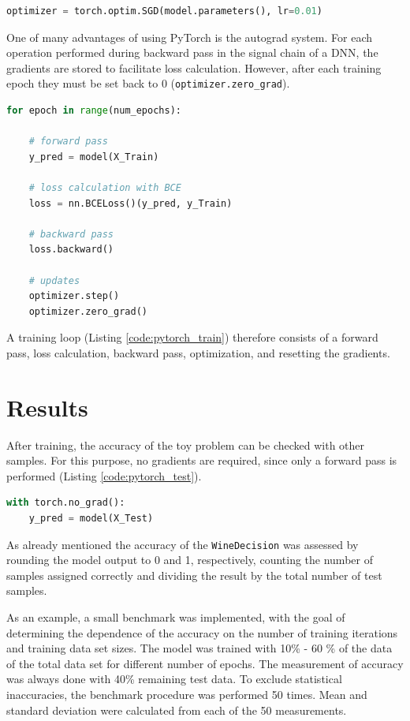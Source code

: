 \begin{lstlisting}[float, language=python, caption={Usage of PyTorchs Stochastic Gradient Descent optimization algorithm.}, label=code:pytorch_optim]
optimizer = torch.optim.SGD(model.parameters(), lr=0.01)
\end{lstlisting}

One of many advantages of using PyTorch is the autograd system. For each operation performed during backward pass in the signal chain of a DNN, the gradients are stored to facilitate loss calculation. However, after each training epoch they must be set back to $0$ (\texttt{optimizer.zero\_grad}).

\begin{lstlisting}[float, language=python, caption={Training loop in PyTorch.}, label=code:pytorch_train]
for epoch in range(num_epochs):

    # forward pass
    y_pred = model(X_Train)
    
    # loss calculation with BCE
    loss = nn.BCELoss()(y_pred, y_Train)

    # backward pass
    loss.backward()

    # updates
    optimizer.step()
    optimizer.zero_grad()
\end{lstlisting}

A training loop (Listing \ref{code:pytorch_train}) therefore consists of a forward pass, loss calculation, backward pass, optimization, and resetting the gradients.

\section{Results}
After training, the accuracy of the toy problem can be checked with other samples. For this purpose, no gradients are required, since only a forward pass is performed (Listing \ref{code:pytorch_test}).
\begin{lstlisting}[float, language=python, caption={Test loop in PyTorch.}, label=code:pytorch_test]
with torch.no_grad():
    y_pred = model(X_Test)
\end{lstlisting}
As already mentioned the accuracy of the \texttt{WineDecision} was assessed by rounding the model output to 0 and 1, respectively, counting the number of samples assigned correctly and dividing the result by the total number of test samples.

As an example, a small benchmark was implemented, with the goal of determining the dependence of the accuracy on the number of training iterations and training data set sizes. The model was trained with 10\% - 60 \% of the data of the total data set for different number of epochs. The measurement of accuracy was always done with 40\% remaining test data. To exclude statistical inaccuracies, the benchmark procedure was performed 50 times. Mean and standard deviation were calculated from each of the 50 measurements.

